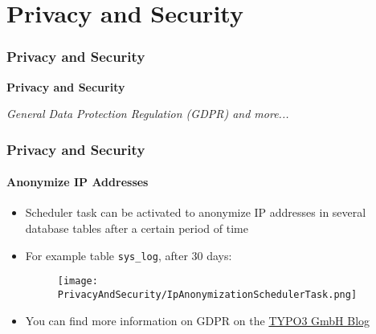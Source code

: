 %

\section{Privacy and Security}
\begin{frame}[fragile]
	\frametitle{Privacy and Security}

	\begin{center}\huge{\color{typo3darkgrey}\textbf{Privacy and Security}}\end{center}
	\begin{center}\large{\textit{General Data Protection Regulation (GDPR) and more...}}\end{center}

\end{frame}


\begin{frame}[fragile]
	\frametitle{Privacy and Security}
	\framesubtitle{Anonymize IP Addresses}

	\begin{itemize}
		\item Scheduler task can be activated to anonymize IP addresses in
			several database tables after a certain period of time
		\item For example table \texttt{sys\_log}, after 30 days:
			\begin{figure}
				\texttt{[image: PrivacyAndSecurity/IpAnonymizationSchedulerTask.png]}
			\end{figure}
		\item You can find more information on GDPR on the \href{https://typo3.com/blog/tag/gdpr/}{TYPO3 GmbH Blog}
	\end{itemize}

\end{frame}


